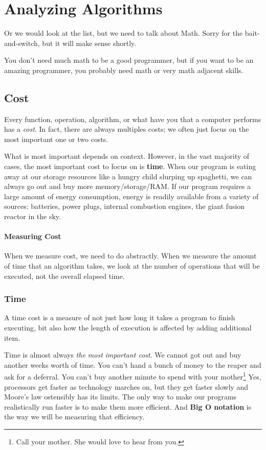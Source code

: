 \chapter{Analyzing Algorithms}
Or we would look at the list, but we need to talk about Math.  Sorry for the bait-and-switch, but it will make sense shortly.


You don't need  much math to be a good programmer, but if you want to be an amazing programmer, you probably need math or very math adjacent skills.
\section{Cost}
Every function, operation, algorithm, or what have you that a computer performs has a \emph{cost}. 
In fact, there are always multiples costs;  we often just focus on the most important one or two costs.  

What is most important depends on context.
However, in the vast majority of cases, the most important cost to focus on is \textbf{time}.
When our program is eating away at our storage resources like a hungry child slurping up spaghetti, we can always go out and buy more memory/storage/RAM.
If our program requires a large amount of energy consumption, energy is readily available from a variety of sources: batteries, power plugs, internal combustion engines, the giant fusion reactor in the sky.




\subsubsection*{Measuring Cost}
When we measure cost, we need to do abstractly.  
When we measure the amount of time that an algorithm takes, we look at the number of operations that will be executed, not the overall elapsed time.

\subsection{Time}
A time cost is a measure of not just how long it takes a program to finish executing, bit also how the length of execution is affected by adding additional item.

Time is almost always \emph{the most important cost}. We cannot got out and buy another weeks worth of time.  You can't hand a bunch of money to the reaper and ask for a deferral. You can't buy another minute to spend with your mother\footnote{Call your mother.  She would love to hear from you.} 
Yes, processors get faster as technology marches on, but they get faster slowly and Moore's law ostensibly has its limits.
The only way to make our programs realistically run faster is to make them more efficient.  And \textbf{Big O notation} is the way we will be measuring that efficiency.


